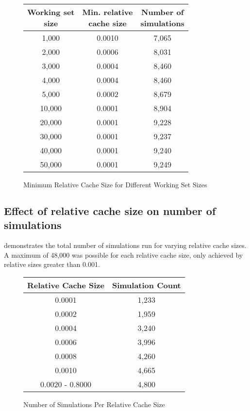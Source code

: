 \begin{figure}[h!]
    \centering
    \caption{Minimum Relative Cache Size for Different Working Set Sizes}
    \label{tab: min_relative_cache_size}
    \begin{tabular}{ccc}
        \toprule
        \makecell{\textbf{Working set} \\ \textbf{size}} & \makecell{\textbf{Min. relative} \\ \textbf{cache size}} & \makecell{\textbf{Number of} \\ \textbf{simulations}} \\
        \midrule
        1,000 & 0.0010 & 7,065 \\
        2,000 & 0.0006 & 8,031 \\
        3,000 & 0.0004 & 8,460 \\
        4,000 & 0.0004 & 8,460 \\
        5,000 & 0.0002 & 8,679 \\
        10,000 & 0.0001 & 8,904 \\
        20,000 & 0.0001 & 9,228 \\
        30,000 & 0.0001 & 9,237 \\
        40,000 & 0.0001 & 9,240 \\
        50,000 & 0.0001 & 9,249 \\
        \bottomrule
    \end{tabular}
\end{figure}


\subsection{Effect of relative cache size on number of simulations}\label{appendix:relative-cache-size-simulations}

 demonstrates the total number of simulations run for varying relative cache sizes. A maximum of 48,000 was possible for each relative cache size, only achieved by relative sizes greater than 0.001.

\begin{figure}[h!]
    \centering
    \caption{Number of Simulations Per Relative Cache Size}
    \label{tab:data_size}
    \begin{tabular}{cc}
        \toprule
        \textbf{Relative Cache Size} & \textbf{Simulation Count} \\
        \midrule
        0.0001 & 1,233 \\
        0.0002 & 1,959 \\
        0.0004 & 3,240 \\
        0.0006 & 3,996 \\
        0.0008 & 4,260 \\
        0.0010 & 4,665 \\
        0.0020 - 0.8000 & 4,800 \\
        \bottomrule
    \end{tabular}
\end{figure}





